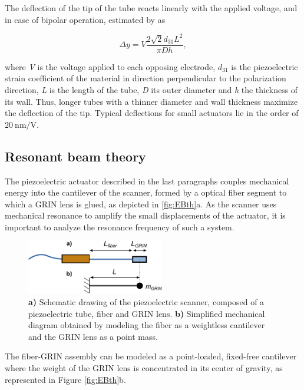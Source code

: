 \documentclass[10pt]{iopart}
\begin{document}
The deflection of the tip of the tube reacts linearly with the applied voltage, and in case of bipolar operation, estimated by \cite{Chen} as

\begin{equation}
\Delta y = V  \frac{2 \sqrt{2} d_{31} L^2}{\pi D h},
\end{equation}

where \textit{V} is the voltage applied to each opposing electrode, $d_{31}$ is the piezoelectric strain coefficient of the material in direction perpendicular to the polarization direction, \textit{L} is the length of the tube, \textit{D} its outer diameter and \textit{h} the thickness of its wall. Thus, longer tubes with a thinner diameter and wall thickness maximize the deflection of the tip. Typical deflections for small actuators lie in the order of $\SI{20}{\nano\meter / \volt}$.


\subsection{Resonant beam theory}
\label{sec:EB}
The piezoelectric actuator described in the last paragraphs couples mechanical energy into the cantilever of the scanner, formed by a optical fiber segment to which a GRIN lens is glued, as depicted in \autoref{fig:EBth}a. As the scanner uses mechanical resonance to amplify the small displacements of the actuator, it is important to analyze the resonance frequency of such a system. 

\begin{figure}[h!]\centering
      \includegraphics[width=6cm]{figures/EB.pdf}
      \caption{\textbf{a)} Schematic drawing of the piezoelectric scanner, composed of a piezoelectric tube, fiber and GRIN lens. 
      \textbf{b)} Simplified mechanical diagram obtained by modeling the fiber as a weightless cantilever and the GRIN lens as a point mass.}
      \label{fig:EB}
\end{figure}

The fiber-GRIN assembly can be modeled as a point-loaded, fixed-free cantilever where the weight of the GRIN lens is concentrated in its center of gravity, as represented in Figure \ref{fig:EBth}b. 
\end{document}
